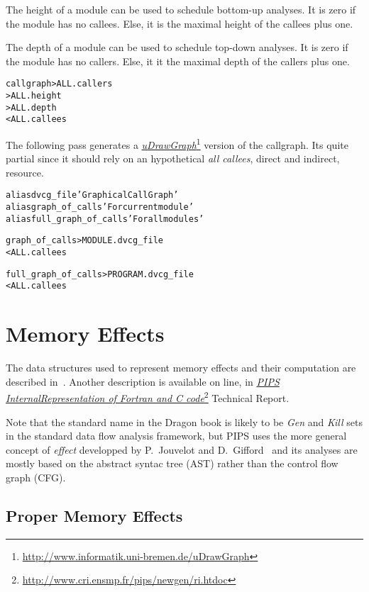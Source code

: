 \documentclass[a4paper]{report}
\newenvironment{PipsMake}{\begin{alltt}}{\end{alltt}}
\newcommand{\LINK}[2]{\href{#2}{#1}\footnote{\url{#2}}\xspace}
\newcommand{\PuDrawGraph}{\LINK{\emph{uDrawGraph}}{http://www.informatik.uni-bremen.de/uDrawGraph}\xspace}
\newcommand{\Pri}{\LINK{\emph{PIPS Internal\space{}Representation of
      Fortran and C code}}{http://www.cri.ensmp.fr/pips/newgen/ri.htdoc}}
\begin{document}
The height of a module can be used to schedule bottom-up analyses. It is
zero if the module has no callees. Else, it is the maximal height of the
callees plus one.

The depth of a module can be used to schedule top-down analyses. It is
zero if the module has no callers. Else, it it the maximal depth of the
callers plus one.

\begin{PipsMake}
callgraph                       > ALL.callers
                                > ALL.height
                                > ALL.depth
        < ALL.callees
\end{PipsMake}

The following pass generates a \PuDrawGraph version of the callgraph.  Its
quite partial since it should rely on an hypothetical \emph{all callees},
direct and indirect, resource.

\begin{PipsMake}
alias dvcg_file 'Graphical Call Graph'
alias graph_of_calls 'For current module'
alias full_graph_of_calls 'For all modules'

graph_of_calls               > MODULE.dvcg_file
        < ALL.callees

full_graph_of_calls          > PROGRAM.dvcg_file
        < ALL.callees
\end{PipsMake}

\section{Memory Effects}
\label{subsection-effects}

The data structures used to represent memory effects and their
computation are described in~\cite{IJT92}. Another description is
available on line, in \Pri{} Technical Report.

Note that the standard name in the Dragon book is likely to be {\em
  Gen} and {\em Kill} sets in the standard data flow analysis
framework, but PIPS uses the more general concept of {\em effect}
developped by P.~Jouvelot and D.~Gifford~\cite{JG89} and its analyses are mostly
based on the abstract syntac tree (AST) rather than the control flow
graph (CFG).

\subsection{Proper Memory Effects}
\label{subsubsection-proper-effects}
\end{document}
